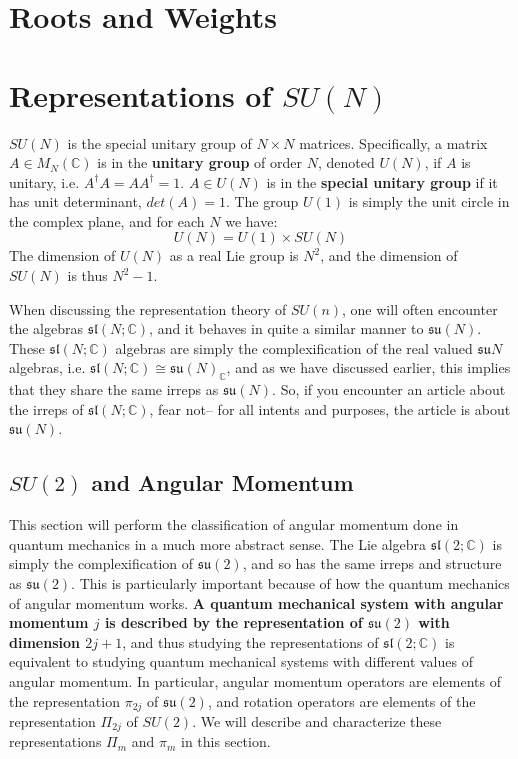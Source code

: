 \documentclass[11pt, oneside]{article}   	%
\theoremstyle{definition}
\begin{document}
\section{Roots and Weights}

\label{sec:su_n}
\section{Representations of $SU(N)$}

$SU(N)$ is the special unitary group of $N\times N$ matrices. Specifically, a matrix $A\in M_{N}(\mathbb C)$ is 
in the \textbf{unitary group} of order $N$, denoted $U(N)$, if $A$ is unitary, i.e. $A^\dagger A = AA^\dagger = 1$. 
$A\in U(N)$ is in the \textbf{special unitary group} if it has unit determinant, $det(A) = 1$. The group $U(1)$ is 
simply the unit circle in the complex plane, and for each $N$ we have:
\begin{equation}
	U(N) = U(1)\times SU(N)
\end{equation}
The dimension of $U(N)$ as a real Lie group is $N^2$, and the dimension of $SU(N)$ is thus $N^2 - 1$. 

When discussing the representation theory of $SU(n)$, one will often encounter the algebras $\mathfrak{sl}(N; 
\mathbb C)$, and it behaves in quite a similar manner to $\mathfrak{su}(N)$. These $\mathfrak{sl}(N; \mathbb C)$ 
algebras are simply the complexification of the real valued $\mathfrak{su}{N}$ algebras, i.e. 
$\mathfrak{sl}(N; \mathbb C)\cong \mathfrak{su}(N)_\mathbb{C}$, and as we have discussed earlier, this implies 
that they share the same irreps as $\mathfrak{su}(N)$. So, if you encounter an article about the irreps of 
$\mathfrak{sl}(N; \mathbb C)$, fear not-- for all intents and purposes, the article is about $\mathfrak{su}(N)$. 

\subsection{$SU(2)$ and Angular Momentum}

This section will perform the classification of angular momentum done in quantum mechanics in a 
much more abstract sense. The Lie algebra $\mathfrak{sl}(2; \mathbb C)$ is simply the complexification 
of $\mathfrak{su}(2)$, and so has the same irreps and structure as $\mathfrak{su}(2)$. This is 
particularly important because of how the quantum mechanics of angular momentum works. \textbf{A 
quantum mechanical system with angular momentum $j$ is described by the representation of 
$\mathfrak{su}(2)$ with dimension $2j + 1$}, and thus studying the representations of $\mathfrak{sl}(2; \mathbb C)$ 
is equivalent to studying quantum mechanical systems with different values of angular momentum. 
In particular, angular momentum operators are elements of the representation $\pi_{2j}$ of $\mathfrak{su}(2)$, 
and rotation operators are elements of the representation $\Pi_{2j}$ of $SU(2)$. We will describe and characterize 
these representations $\Pi_m$ and $\pi_m$ in this section. 
\end{document}
